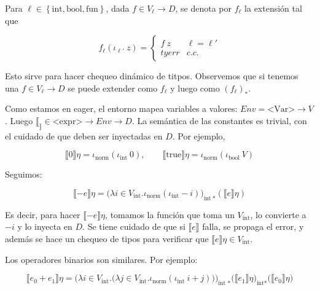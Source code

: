 \documentclass[article, 12pt]{article}
\begin{document}
Para $\ell \in \left\{ \text{int}, \text{bool}, \text{fun} \right\} $, dada $f
\in V_\ell \to D$, se denota por $f_\ell$ la extensión tal que 

\begin{equation*}
  f_\ell(\iota_{ \ell' } ~ z) = \begin{cases}
    f ~ z & \ell = \ell' \\ 
    tyerr & c.c.
  \end{cases}
\end{equation*}

Esto sirve para hacer chequeo dinámico de titpos. Observemos que si tenemos una 
$f \in V_\ell \to D$ se puede extender como $f_\ell$ y luego como $(f_\ell)_*$.

Como estamos en eager, el entorno mapea variables a valores: $Env = \text{<Var>}
\to V$. Luego $\llbracket _ \rrbracket \in \text{<expr>} \to Env \to D$. La
semántica de las constantes es trivial, con el cuidado de que deben ser
inyectadas en $D$. Por ejemplo, 

\begin{equation*}
  \llbracket 0 \rrbracket\eta = \iota_\text{norm}(\iota_{\text{int}} ~ 0), \qquad
  \llbracket \text{true} \rrbracket\eta =
  \iota_{\text{norm}}(\iota_{\text{bool}} ~ V)
\end{equation*}

Seguimos:

\begin{equation*}
  \llbracket -e \rrbracket\eta = \big( \lambda i \in V_{\text{int}}.
  \iota_{\text{norm}} (\iota_{\text{int}} - i) \big)_{\text{int} ~ *}
  (\llbracket e \rrbracket \eta)
\end{equation*}

Es decir, para hacer $\llbracket -e \rrbracket\eta$, tomamos la función que toma
un $V_{\text{int}}$, lo convierte a $-i$ y lo inyecta en $D$. Se tiene cuidado
de que si $\llbracket e \rrbracket$ falla, se propaga el error, y además se hace
un chequeo de tipos para verificar que $\llbracket e \rrbracket\eta \in
V_{\text{int}}$. 

Los operadores binarios son similares. Por ejemplo: 

\begin{equation*}
  \llbracket e_0 + e_1 \rrbracket\eta = \Big( \lambda i \in V_{\text{int}}.
  \big( \lambda j \in V_{\text{int}}.\iota_{\text{norm}}(\iota_{\text{int}} ~ i
+ j) \big) \Big)_{\text{int *}} \big( \llbracket e_1 \rrbracket\eta
\big)_{\text{int*}} \big( \llbracket e_0 \rrbracket\eta \big)
\end{equation*}
\end{document}
